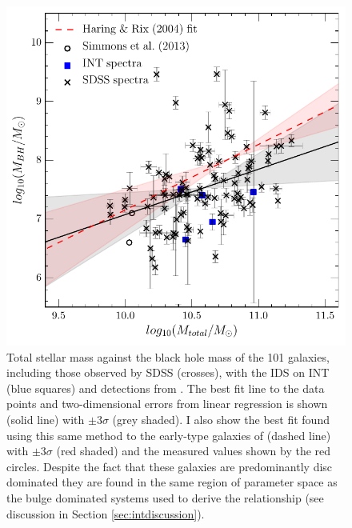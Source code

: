 {\begin{figure}
\centering
\includegraphics[width=\textwidth]{agn/mass_bh_total_mass_fit_linmix_fit.pdf}
\caption[Black hole stellar mass relation for the \textsc{discdom} sample]{Total stellar mass against the black hole mass of the 101 galaxies, including those observed by SDSS (crosses), with the IDS on INT (blue squares) and detections from \citet[open cirlces]{Simmons13}. The best fit line to the data points and two-dimensional errors from linear regression is shown (solid line) with $\pm3\sigma$ (grey shaded). I also show the best fit found using this same method to the early-type galaxies of \citet{haringrix04} (dashed line) with $\pm3\sigma$ (red shaded) and the measured values shown by the red circles. Despite the fact that these galaxies are predominantly disc dominated they are found in the same region of parameter space as the bulge dominated systems used to derive the \citet{haringrix04} relationship (see discussion in Section \ref{sec:intdiscussion}).
}
\label{fig:totvsbh}
\end{figure}

}

